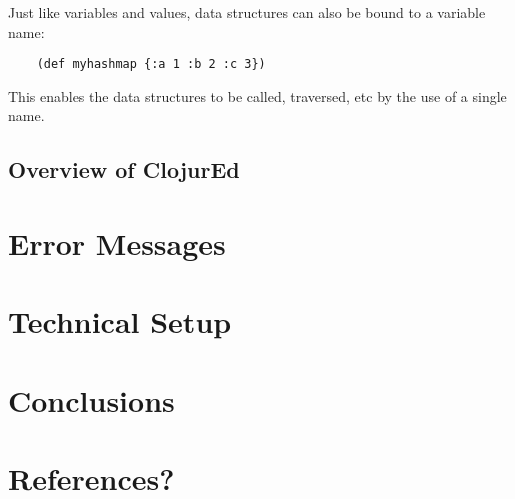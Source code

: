\documentclass[12pt]{article}
\newcommand{\comment}[1]{}
\newcommand{\escomment}[1]{\textcolor{BlueViolet}{\comment{Emma: {#1}}}}
\begin{document}
Just like variables and values, data structures can also be bound to a variable name:
\begin{verbatim}
	(def myhashmap {:a 1 :b 2 :c 3})
\end{verbatim}

This enables the data structures to be called, traversed, etc by the use of a single name.

\subsection{Overview of ClojurEd}\label{sec:project}

\section{Error Messages}\label{sec:errors}

\section{Technical Setup}\label{sec:technical}

\section{Conclusions}\label{sec:conclusion}

\section{References?}\label{sec:reference}

\end{document}
